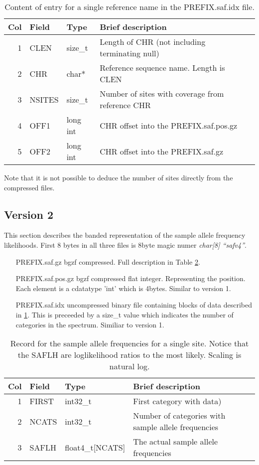 \documentclass[10pt]{article}
\begin{document}
\begin{table}
\begin{tabular}{rllll}
  \hline
  {\bf Col} & {\bf Field} & {\bf Type} & {\bf Brief description} \\
  \hline
  1 & {\sf CLEN} & size\_t &  Length of CHR (not including terminating null)\\
  2 & {\sf CHR} & char* & Reference sequence name. Length is CLEN\\
  3 & {\sf NSITES} & size\_t & Number of sites with coverage from reference CHR\\
  4 & {\sf OFF1} & long int & CHR offset into the PREFIX.saf.pos.gz \\
  5 & {\sf OFF2} & long int & CHR offset into the PREFIX.saf.gz \\
  \hline
\end{tabular}\label{tab1}
\caption{Content of entry for a single reference name in the PREFIX.saf.idx file.}
\end{table}
 Note that it is not possible to deduce the number of sites directly
 from the compressed files.
\clearpage
\subsection{Version 2}
This section describes the banded representation of the sample allele frequency likelihoods.  First 8 bytes in all three files is 8byte magic numer \emph{char[8] ``safv4''}.  
\begin{itemize}
\item[PREFIX.saf.gz] bgzf compressed. Full description in Table \ref{tab3}.
\item[PREFIX.saf.pos.gz] bgzf compressed flat integer. Representing   the position. Each element is a cdatatype 'int' which is  4bytes. Similar to version 1.
\item[PREFIX.saf.idx] uncompressed binary file containing blocks of   data described in \ref{tab1}. This is preceeded by a size\_t value
  which indicates the number of categories in the spectrum. Similiar to version 1.
\end{itemize}

\begin{table}[h]
\begin{tabular}{rllll}
  \hline
  {\bf Col} & {\bf Field} & {\bf Type} & {\bf Brief description} \\
  \hline
  1 & {\sf FIRST} & int32\_t  &  First category with data)\\
  2 & {\sf NCATS} & int32\_t & Number of categories with sample allele frequencies\\
  3 & {\sf SAFLH} & float4\_t[NCATS] & The actual sample allele frequencies\\
  \hline
\end{tabular}
\caption{Record for the sample allele frequencies for a single site. Notice that the SAFLH are loglikelihood ratios to the most likely. Scaling is natural log.}
\label{tab3}
\end{table}
\end{document}
